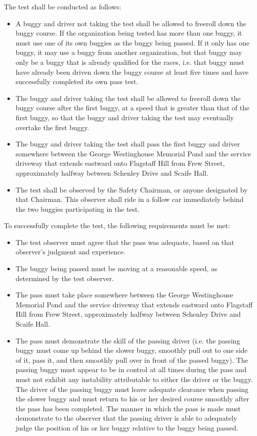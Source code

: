 The test shall be conducted as follows:
\begin{itemize}
	\item A buggy and driver not taking the test shall be allowed to freeroll down the buggy course. If the organization being tested has more than one buggy, it must use one of its own buggies as the buggy being passed. If it only has one buggy, it may use a buggy from another organization, but that buggy may only be a buggy that is already qualified for the races, i.e. that buggy must have already been driven down the buggy course at least five times and have successfully completed its own pass test.
	\item The buggy and driver taking the test shall be allowed to freeroll down the buggy course after the first buggy, at a speed that is greater than that of the first buggy, so that the buggy and driver taking the test may eventually overtake the first buggy.
	\item The buggy and driver taking the test shall pass the first buggy and driver somewhere between the George Westinghouse Memorial Pond and the service driveway that extends eastward onto Flagstaff Hill from Frew Street, approximately halfway between Schenley Drive and Scaife Hall.
	\item The test shall be observed by the Safety Chairman, or anyone designated by that Chairman. This observer shall ride in a follow car immediately behind the two buggies participating in the test.
\end{itemize}

To successfully complete the test, the following requirements must be met:
\begin{itemize}
	\item The test observer must agree that the pass was adequate, based on that observer's judgment and experience.
	\item The buggy being passed must be moving at a reasonable speed, as determined by the test observer.
	\item The pass must take place somewhere between the George Westinghouse Memorial Pond and the service driveway that extends eastward onto Flagstaff Hill from Frew Street, approximately halfway between Schenley Drive and Scaife Hall.
	\item The pass must demonstrate the skill of the passing driver (i.e. the passing buggy must come up behind the slower buggy, smoothly pull out to one side of it, pass it, and then smoothly pull over in front of the passed buggy). The passing buggy must appear to be in control at all times during the pass and must not exhibit any instability attributable to either the driver or the buggy. The driver of the passing buggy must leave adequate clearance when passing the slower buggy and must return to his or her desired course smoothly after the pass has been completed. The manner in which the pass is made must demonstrate to the observer that the passing driver is able to adequately judge the position of his or her buggy relative to the buggy being passed.
\end{itemize}


